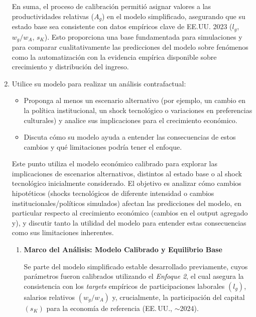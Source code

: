 \documentclass{article}
\theoremstyle{remark}
\theoremstyle{definition}
\begin{document}
\begin{enumerate}
\begin{tcolorbox}[title= Soluci\'on 6]
En suma, el proceso de calibración permitió asignar valores a las productividades relativas ($A_g$) en el modelo simplificado, asegurando que su estado base sea consistente con datos empíricos clave de EE.UU. 2023 ($l_g$, $w_g/w_A$, $s_K$). Esto proporciona una base fundamentada para simulaciones y para comparar cualitativamente las predicciones del modelo sobre fenómenos como la automatizaci\'on con la evidencia empírica disponible sobre crecimiento y distribución del ingreso.

        \end{tcolorbox}
    
    \item Utilice su modelo para realizar un análisis contrafactual:
    \begin{itemize}
        \item Proponga al menos un escenario alternativo (por ejemplo, un cambio en la política institucional, un shock tecnológico o variaciones en preferencias culturales) y analice sus implicaciones para el crecimiento económico.
        \item Discuta cómo su modelo ayuda a entender las consecuencias de estos cambios y qué limitaciones podría tener el enfoque.
    \end{itemize}

        \begin{tcolorbox}[title= Soluci\'on 7]
        Este punto utiliza el modelo económico calibrado para explorar las implicaciones de escenarios alternativos, distintos al estado base o al shock tecnológico inicialmente considerado. El objetivo es analizar cómo cambios hipotéticos (shocks tecnológicos de diferente intensidad o cambios institucionales/políticos simulados) afectan las predicciones del modelo, en particular respecto al crecimiento económico (cambios en el output agregado y), y discutir tanto la utilidad del modelo para entender estas consecuencias como sus limitaciones inherentes.
            \begin{enumerate}[label=(\alph*)]

\item \textbf{Marco del Análisis: Modelo Calibrado y Equilibrio Base} 

Se parte del modelo simplificado estable desarrollado previamente, cuyos parámetros fueron calibrados utilizando el \emph{Enfoque 2}, el cual asegura la consistencia con los \emph{targets} empíricos de participaciones laborales $(l_g)$, salarios relativos $(w_g/w_A)$ y, crucialmente, la participación del capital $(s_K)$ para la economía de referencia (EE.\,UU., $\sim$2024).


\end{enumerate}
\end{tcolorbox}
\end{enumerate}
\end{document}

